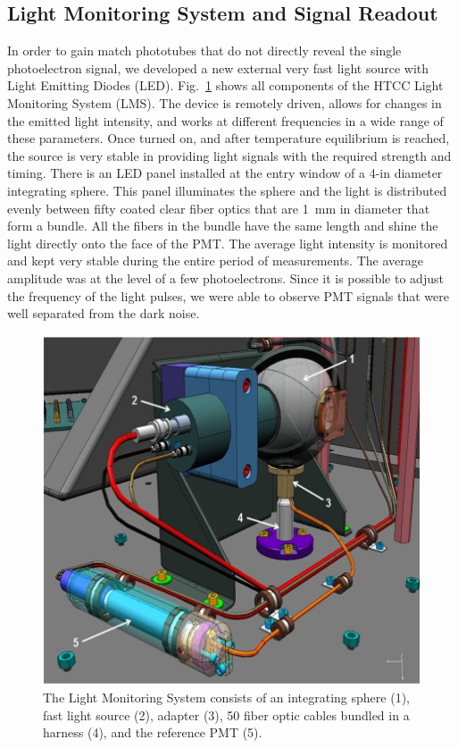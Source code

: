 \subsection{Light Monitoring System and Signal Readout}

In order to gain match phototubes that do not directly reveal the single photoelectron signal, we developed a new
external very fast light source with Light Emitting Diodes (LED). Fig.~\ref{fig:LMS_Picture_3} shows all
components of the HTCC Light Monitoring System (LMS). The device is remotely driven, allows for changes in the
emitted light intensity, and works at different frequencies in a wide range of these parameters. Once turned on,
and after temperature equilibrium is reached, the source is very stable in providing light signals with the required
strength and timing. There is an LED panel installed at the entry window of a 4-in diameter integrating sphere. This
panel illuminates the sphere and the light is distributed evenly between fifty coated clear fiber optics that are 1~mm
in diameter that form a bundle. All the fibers in the bundle have the same length and shine the light directly onto the
face of the PMT. The average light intensity is monitored and kept very stable during the entire period of
measurements. The average amplitude was at the level of a few photoelectrons. Since it is possible to adjust the
frequency of the light pulses, we were able to observe PMT signals that were well separated from the dark noise.
 
\begin{figure}[!ht]
    \centering
    \includegraphics[width=1.0\linewidth,trim={0.0cm 0.0cm 0.0cm 0.0cm},clip]{images/LMS_Picture_3.jpg}
    \caption{The Light Monitoring System consists of an integrating sphere (1), fast light source (2), adapter (3),
      50 fiber optic cables bundled in a harness (4), and the reference PMT (5).}
    \label{fig:LMS_Picture_3}
\end{figure} 
 
